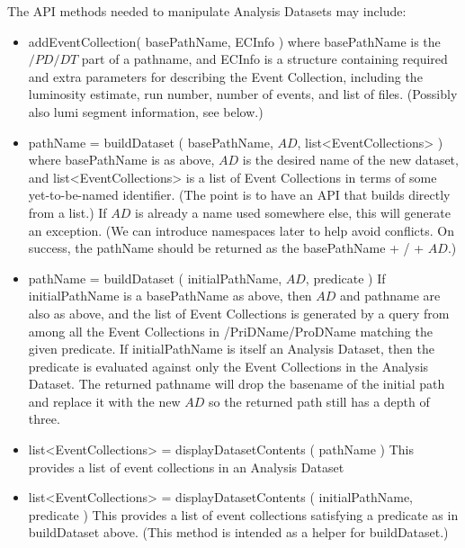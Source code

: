 \documentclass{cmspaper}
\begin{document}
  The API methods needed to manipulate Analysis Datasets may include: 
\begin{itemize}
\item addEventCollection( basePathName, ECInfo ) 
       where basePathName is the $/PD/DT$ part of a pathname, and ECInfo 
       is a structure containing required and extra parameters for describing 
       the Event Collection, including the luminosity estimate, run number, 
       number of events, and list of files.  (Possibly also lumi segment 
       information, see below.) 

\item pathName = buildDataset ( basePathName, $AD$, list<EventCollections> )
       where basePathName is as above, $AD$ is the desired name of the new
       dataset,  and list<EventCollections> is a list of Event Collections in 
       terms of some yet-to-be-named identifier.  (The point is to have an API 
       that builds directly from a list.)  If $AD$ is already a name used 
       somewhere else, this will generate an exception.   (We can introduce 
       namespaces later to help avoid conflicts.  On success, the pathName 
       should be returned as the basePathName + / + $AD$.) 

\item  pathName = buildDataset ( initialPathName, $AD$, predicate )
       If initialPathName is a basePathName as above, then $AD$ and pathname 
       are also as above, and the list of Event Collections is generated by a
       query from among all the Event Collections in /PriDName/ProDName 
       matching the given predicate.  If initialPathName is itself an Analysis 
       Dataset, then the predicate is evaluated against only the Event 
       Collections in the Analysis Dataset.  The returned pathname will drop 
       the basename of the initial path and replace it with the new $AD$ so 
       the returned path still has a depth of three.  

\item  list<EventCollections> = displayDatasetContents ( pathName ) 
       This provides a list of event collections in an Analysis Dataset 

\item  list<EventCollections> = displayDatasetContents ( initialPathName, predicate ) 
       This provides a list of event collections satisfying a predicate as in 
       buildDataset above.  (This method is intended as a helper for 
       buildDataset.) 


\end{itemize}
\end{document}
